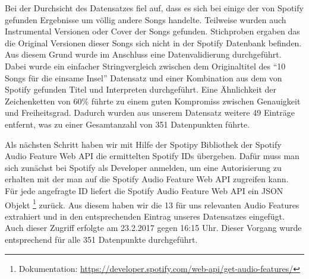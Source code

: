Bei der Durchsicht des Datensatzes fiel auf, dass es sich bei einige der von Spotify gefunden Ergebnisse um völlig andere Songs handelte.
Teilweise wurden auch Instrumental Versionen oder Cover der Songs gefunden.
Stichproben ergaben das die Original Versionen dieser Songs sich nicht in der Spotify Datenbank befinden.
Aus diesem Grund wurde im Anschluss eine Datenvalidierung durchgeführt.
Dabei wurde ein einfacher Stringvergleich zwischen dem Originaltitel des "`10 Songs für die einsame Insel"' Datensatz und einer Kombination aus dem von Spotify gefunden Titel und Interpreten durchgeführt.
Eine Ähnlichkeit der Zeichenketten von 60\% führte zu einem guten Kompromiss zwischen Genauigkeit und Freiheitsgrad.
Dadurch wurden aus unserem Datensatz weitere 49 Einträge entfernt, was zu einer Gesamtanzahl von 351 Datenpunkten führte.

Als nächsten Schritt haben wir mit Hilfe der Spotipy Bibliothek der Spotify Audio Feature Web API die ermittelten Spotify IDs übergeben.
Dafür muss man sich zunächst bei Spotify als Developer anmelden, um eine Autorisierung zu erhalten mit der man auf die Spotify Audio Feature Web API zugreifen kann.
Für jede angefragte ID liefert die Spotify Audio Feature Web API ein JSON Objekt \footnote{Dokumentation: \url{https://developer.spotify.com/web-api/get-audio-features/}} zurück.
Aus diesem haben wir die 13 für uns relevanten Audio Features extrahiert und in den entsprechenden Eintrag unseres Datensatzes eingefügt.
Auch dieser Zugriff erfolgte am 23.2.2017 gegen 16:15 Uhr.
Dieser Vorgang wurde entsprechend für alle 351 Datenpunkte durchgeführt.

